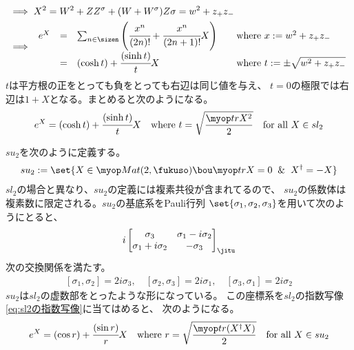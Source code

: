 {\begin{example}[sl(2)]
\begin{equation*}
\begin{split}
			&\implies X^2 = W^2 + ZZ^\sigma + (W + W^\sigma)Z\sigma
				= w^2 + z_+z_- \\
			&\implies \begin{array}{rcll}
				e^X &=& \sum_{n\in\sizen}\left(
					\cfrac{x^n}{(2n)!} + \cfrac{x^n}{(2n+1)!}X\right)
					& \quad\text{where } x := w^2 + z_+z_- \\
				&=& (\cosh t) + \cfrac{(\sinh t)}{t}X
					& \quad\text{where } t := \pm\sqrt{w^2 + z_+z_-}
			\end{array}
		\end{split}\end{equation*}
		$t$は平方根の正をとっても負をとっても右辺は同じ値を与え、
		$t=0$の極限では右辺は$1+X$となる。まとめると次のようになる。
		\begin{equation}\label{eq:sl2の指数写像}\begin{split}
			e^X = (\cosh t) + \cfrac{(\sinh t)}{t}X \quad\text{where }
			t = \sqrt{\frac{\tr X^2}{2}} \quad\text{for all } X\in sl_2
		\end{split}\end{equation}
	\end{example} %

	\begin{example}[su(2)]\label{eg:su(2)の指数写像} %
		$su_2$を次のように定義する。
		\begin{equation*}\begin{split}
			su_2 := \set{X\in\Mat(2,\fukuso)\bou \tr X = 0 \And X^\dag = - X}
		\end{split}\end{equation*}
		$sl_2$の場合と異なり、$su_2$の定義には複素共役が含まれてるので、
		$su_2$の係数体は複素数に限定される。$su_2$の基底系をPauli行列
		$\set{\sigma_1,\sigma_2,\sigma_3}$を用いて次のようにとると、
		\begin{equation*}\label{eq:su2の基底系}\begin{split}
			i\begin{bmatrix}
				\sigma_3 & \sigma_1-i\sigma_2 \\ \sigma_1+i\sigma_2 & - \sigma_3
			\end{bmatrix}_\jitu
		\end{split}\end{equation*}
		次の交換関係を満たす。
		\begin{equation*}\begin{split}
			[\sigma_1,\sigma_2] = 2i\sigma_3
			,\quad [\sigma_2,\sigma_3] = 2i\sigma_1
			,\quad [\sigma_3,\sigma_1] = 2i\sigma_2
		\end{split}\end{equation*}
		$su_2$は$sl_2$の虚数部をとったような形になっている。
		この座標系を$sl_2$の指数写像\eqref{eq:sl2の指数写像}に当てはめると、
		次のようになる。
		\begin{equation}\label{eq:su2の指数写像}\begin{split}
			e^X = (\cos r) + \cfrac{(\sin r)}{r}X \quad\text{where }
			r = \sqrt{\frac{\tr(X^\dag X)}{2}} \quad\text{for all } X\in su_2
		\end{split}\end{equation}
	\end{example} %
}
